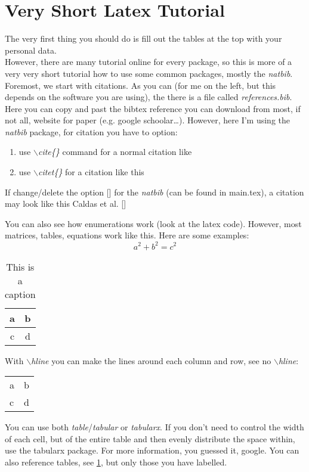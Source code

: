 \section{Very Short Latex Tutorial}

The very first thing you should do is fill out the tables at the top with your personal data.
\\
However, there are many tutorial online for every package, so this is more of a very very short tutorial how to use some common packages, mostly the \textit{natbib}.
Foremost, we start with citations. As you can (for me on the left, but this depends on the software you are using), the there is a file called \textit{references.bib}. Here you can copy and past the bibtex reference you can download from most, if not all, website for paper (e.g. google schoolar…).
However, here I'm using the \textit{natbib} package, for citation you have to option:
\begin{enumerate}
    \item use \textit{$\backslash$cite\{\}} command for a normal citation like \cite{Caldas}
    \item use \textit{$\backslash$citet\{\}} for a citation like this \citet{Caldas}
\end{enumerate}
If change/delete the option [] for the \textit{natbib} (can be found in main.tex), a citation may look like this Caldas et al. [\citeyear{Caldas}]

You can also see how enumerations work (look at the latex code).
However, most matrices, tables, equations work like this. Here are some examples:
\begin{equation}
    a^2+b^2=c^2
\end{equation}

\begin{table}[h]
    \centering
    \begin{tabular}{|c|c|}
        \hline
        a & b \\ \hline
        c & d \\
        \hline
    \end{tabular}
    \caption{This is a caption}
    \label{tab:my_label}
\end{table}

With \textit{$\backslash$hline} you can make the lines around each column and row, see no \textit{$\backslash$hline}: \vspace{0.4cm}\\ %
\noindent %
\begin{tabularx}{\textwidth}{XX}
    a & b \\
    c & d
\end{tabularx}
You can use both \textit{table}/\textit{tabular} or \textit{tabularx}. If you don't need to control the width of each cell, but of the entire table and then evenly distribute the space within, use the tabularx package. For more information, you guessed it, google. You can also reference tables, see \ref{tab:my_label}, but only those you have labelled.
